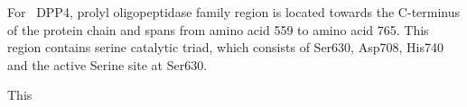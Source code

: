For~ DPP4, prolyl oligopeptidase family region is located towards the C-terminus of the protein chain and spans from amino acid 559 to amino acid 765. This region contains serine catalytic triad, which consists of Ser630, Asp708, His740 and the active Serine site at Ser630. \par
This 